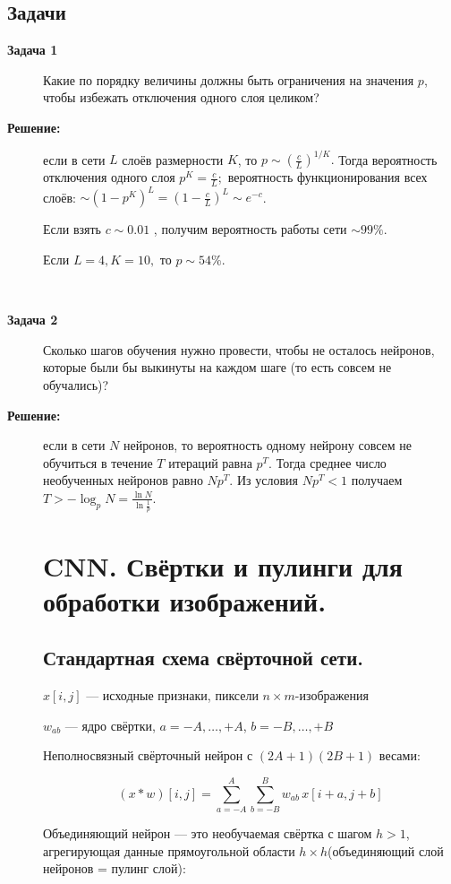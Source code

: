 \subsection{Задачи}
\begin{description}
\item[\textbf{Задача 1}] 
    Какие по порядку величины должны быть ограничения на значения $p$, чтобы избежать отключения одного слоя целиком?
\item[\textbf{Решение:}] если в сети $L$ слоёв размерности $K$, то $p \sim (\frac{c}{L})^{1/K}. $
    Тогда вероятность отключения одного слоя $p^K = \frac{c}{L}; $ вероятность функционирования всех слоёв: $\sim (1-p^K)^L = (1-\frac{c}{L})^L \sim e^{-c}$.
    
    Если взять $c\sim 0.01$ , получим вероятность работы сети $\sim 99\%$.
    
    Если $L=4, K=10,$ то $p \sim 54\%$.

\

\item[\textbf{Задача 2}] 
    Сколько шагов обучения нужно провести, чтобы не осталось нейронов, которые были бы выкинуты на каждом шаге (то есть совсем не обучались)?

\item[\textbf{Решение:}] если в сети $N$ нейронов, то вероятность одному нейрону совсем не обучиться в течение $T$ итераций равна $p^T$. Тогда среднее число необученных нейронов равно $Np^T$. Из условия $Np^T<1$ получаем $T>-\log_{p}N = \frac{\ln N}{\ln \frac{1}{p}}$.

\section{CNN. Свёртки и пулинги для обработки изображений.}
\subsection{Стандартная схема свёрточной сети.}

$ x[i, j] $ — исходные признаки, пиксели $ n \times m $-изображения

$ w_{ab} $ — ядро свёртки, $ a = -A, \ldots, +A $, $ b = -B, \ldots, +B $

Неполносвязный свёрточный нейрон с $ (2A + 1)(2B + 1) $ весами:

$$
(x * w)[i, j] = \sum_{a=-A}^{A} \sum_{b=-B}^{B} w_{ab} \, x[i + a, j + b]
$$

Объединяющий нейрон — это необучаемая свёртка с шагом $ h > 1 $, агрегирующая данные прямоугольной области $ h \times h $(объединяющий слой нейронов = пулинг слой):


\end{description}
